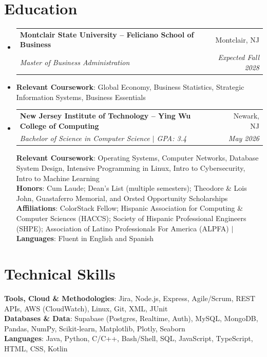 \documentclass[letterpaper,10pt]{article}
\makeatletter
\newcommand{\resumeSubheading}[4]{
  \vspace{-2pt}\item
    \begin{tabular*}{0.97\textwidth}[t]{l@{\extracolsep{\fill}}r}
      \textbf{#1} & #2 \\
      \textit{\small#3} & \textit{\small #4} \\
    \end{tabular*}\vspace{-7pt}
}
\newcommand{\resumeSubHeadingListStart}{\begin{itemize}[leftmargin=0.15in, label={}]}
\newcommand{\resumeSubHeadingListEnd}{\end{itemize}}
\makeatother
\begin{document}
\section{Education}
  \resumeSubHeadingListStart
    \resumeSubheading
      {Montclair State University -- Feliciano School of Business}{Montclair, NJ}
      {Master of Business Administration}{Expected Fall 2028}
      \vspace{2pt}\item[] \small \textbf{Relevant Coursework}: Global Economy, Business Statistics, Strategic Information Systems, Business Essentials
    \resumeSubheading
      {New Jersey Institute of Technology -- Ying Wu College of Computing}{Newark, NJ}
      {Bachelor of Science in Computer Science $|$ GPA: 3.4}{May 2026}
      \begin{flushleft}
        \small \textbf{Relevant Coursework}: Operating Systems, Computer Networks, Database System Design, Intensive Programming in Linux, Intro to Cybersecurity, Intro to Machine Learning \\
        \small \textbf{Honors}: Cum Laude; Dean's List (multiple semesters); Theodore \& Lois John, Guastaferro Memorial, and Orsted Opportunity Scholarships \\
        \small \textbf{Affiliations}: ColorStack Fellow; Hispanic Association for Computing \& Computer Sciences (HACCS); Society of Hispanic Professional Engineers (SHPE); Association of Latino Professionals For America (ALPFA) $|$ \textbf{Languages}: Fluent in English and Spanish
      \end{flushleft}
  \resumeSubHeadingListEnd

\section{Technical Skills}
\begin{itemize}[leftmargin=0.15in, label={}]
    \small{\item{
      \textbf{Tools, Cloud \& Methodologies}{: Jira, Node.js, Express, Agile/Scrum, REST APIs, AWS (CloudWatch), Linux, Git, XML, JUnit} \\
      \textbf{Databases \& Data}{: Supabase (Postgres, Realtime, Auth), MySQL, MongoDB, Pandas, NumPy, Scikit-learn, Matplotlib, Plotly, Seaborn} \\
      \textbf{Languages}{: Java, Python, C/C++, Bash/Shell, SQL, JavaScript, TypeScript, HTML, CSS, Kotlin}
    }}
\end{itemize}
\end{document}
